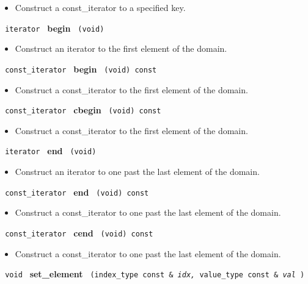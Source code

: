 \begin{itemize}
\item
Construct a const\_iterator to a specified key.
\end{itemize}
 
\noindent
\texttt{%
iterator
}
\textbf{begin}%
\texttt{%
(void)
}

\begin{itemize}
\item
Construct an iterator to the first element of the domain.
\end{itemize}
 
\noindent
\texttt{%
const\_iterator
}
\textbf{begin}%
\texttt{%
(void) const
}

\begin{itemize}
\item
Construct a const\_iterator to the first element of the domain.
\end{itemize}
 
\noindent
\texttt{%
const\_iterator
}
\textbf{cbegin}%
\texttt{%
(void) const
}

\begin{itemize}
\item
Construct a const\_iterator to the first element of the domain.
\end{itemize}
 
\noindent
\texttt{%
iterator
}
\textbf{end}%
\texttt{%
(void)
}

\begin{itemize}
\item
Construct an iterator to one past the last element of the domain.
\end{itemize}
 
\noindent
\texttt{%
const\_iterator
}
\textbf{end}%
\texttt{%
(void) const
}

\begin{itemize}
\item
Construct a const\_iterator to one past the last element of the domain.
\end{itemize}
 
\noindent
\texttt{%
const\_iterator
}
\textbf{cend}%
\texttt{%
(void) const
}

\begin{itemize}
\item
Construct a const\_iterator to one past the last element of the domain.
\end{itemize}
 
\noindent
\texttt{%
void
}
\textbf{set\_element}%
\texttt{%
(index\_type const \&
\textit{idx,}%
value\_type const \&
\textit{val}%
)
}

